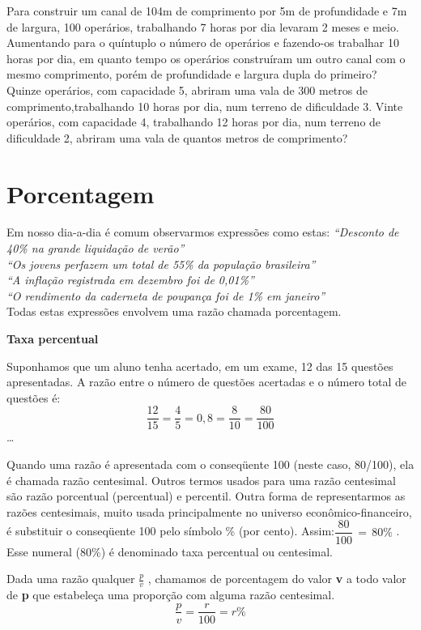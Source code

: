 \begin{exercicios}
    \exitem{} Para construir um canal de 104m de comprimento por 5m de profundidade e 7m de largura, 100 operários, trabalhando 7 horas por dia levaram 2 meses e meio. Aumentando para o quíntuplo o número de operários e fazendo-os trabalhar 10 horas por dia, em quanto tempo os operários construíram um outro canal com o mesmo comprimento, porém de profundidade e largura dupla do primeiro?     
	\exitem{} Quinze operários, com capacidade 5, abriram uma vala de 300 metros de comprimento,trabalhando 10 horas por dia, num terreno de dificuldade 3. Vinte operários, com capacidade 4, trabalhando 12 horas por dia, num terreno de dificuldade 2, abriram uma vala de quantos metros de comprimento?
\end{exercicios}

\section{Porcentagem}

	Em nosso dia-a-dia é comum observarmos expressões como estas:
	\textit{“Desconto de 40\% na grande liquidação de verão”\\
	“Os jovens perfazem um total de 55\% da população brasileira”\\
	“A inflação registrada em dezembro foi de 0,01\%”\\
	“O rendimento da caderneta de poupança foi de 1\% em janeiro”\\}
	Todas estas expressões envolvem uma razão chamada porcentagem.
	
	\textbf{Taxa percentual}

	Suponhamos que um aluno tenha acertado, em um exame, 12 das 15 questões apresentadas. A razão entre o número de questões acertadas e o número total de questões é:
	$$\dfrac{12}{15}=\dfrac{4}{5}=0,8=\dfrac{8}{10}=\dfrac{80}{100}$$\dots
		
	Quando uma razão é apresentada com o conseqüente 100 (neste caso, 80/100), ela é chamada razão centesimal. Outros termos usados para uma razão centesimal são razão porcentual (percentual)  e percentil. 
	Outra forma de representarmos as razões centesimais, muito usada principalmente no universo econômico-financeiro, é substituir o conseqüente  100 pelo símbolo \% (por cento). Assim:$\dfrac{80}{100}\, = \,80\%$ . Esse numeral (80\%) é denominado taxa percentual ou centesimal. 
\begin{caixa}
	\begin{tdefinicao}
		Dada uma razão qualquer $\frac{p}{v}$ , chamamos de porcentagem do valor \textbf{v} a todo valor de \textbf{p} que estabeleça uma proporção com alguma razão centesimal.
		$$\dfrac{p}{v}=\dfrac{r}{100}=r\%$$
	\end{tdefinicao}
\end{caixa}

